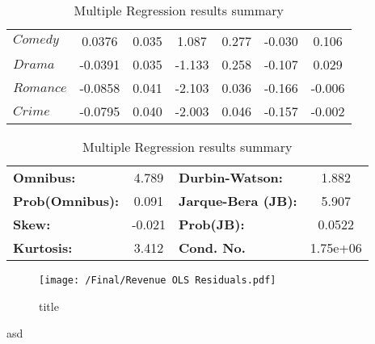 \begin{table}[h]
\begin{center}
\begin{tabular}{lcccccc}
                    \textbf{$Comedy$}               &       0.0376  &        0.035     &     1.087  &         0.277        &       -0.030    &        0.106     \\
                    \textbf{$Drama$}                &      -0.0391  &        0.035     &    -1.133  &         0.258        &       -0.107    &        0.029     \\
                    \textbf{$Romance$}              &      -0.0858  &        0.041     &    -2.103  &         0.036        &       -0.166    &       -0.006     \\
                    \textbf{$Crime$}                &      -0.0795  &        0.040     &    -2.003  &         0.046        &       -0.157    &       -0.002     \\
                    \bottomrule
                \end{tabular}
                \begin{tabular}{lclc}
                    \textbf{Omnibus:}       &  4.789 & \textbf{  Durbin-Watson:     } &    1.882  \\
                    \textbf{Prob(Omnibus):} &  0.091 & \textbf{  Jarque-Bera (JB):  } &    5.907  \\
                    \textbf{Skew:}          & -0.021 & \textbf{  Prob(JB):          } &   0.0522  \\
                    \textbf{Kurtosis:}      &  3.412 & \textbf{  Cond. No.          } & 1.75e+06  \\
                    \bottomrule
                \end{tabular}
            \end{center}
        \caption[short]{Multiple Regression results summary}\label{tab-success-ols-summary}
    \end{table}

\begin{figure}[H]
    \texttt{[image: /Final/Revenue OLS Residuals.pdf]}
    \caption[short]{title}\label{fig-revenue-ols-residuals}
\end{figure}
\newpage
asd
